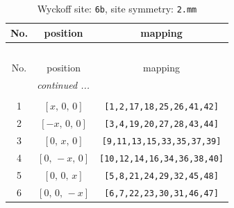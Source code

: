 \documentclass[fleqn,8pt]{jsarticle}
\begin{document}
\renewcommand{\arraystretch}{1.2}
\begin{longtable}{ccc}
\caption{Wyckoff site: {\tt 6b}, site symmetry: {\tt 2.mm}}
 \\
 \hline \hline
No. & position & mapping \\ \hline \endfirsthead

\multicolumn{2}{l}{\tablename\ \thetable{}} \\
 \hline \hline
No. & position & mapping \\ \hline \endhead

 \hline \hline
\multicolumn{2}{r}{\footnotesize\it continued ...} \\ \endfoot

 \hline \hline
\multicolumn{2}{r}{} \\ \endlastfoot

1 & $\left[ x,\, 0,\, 0 \right]$ & {\tt [1,2,17,18,25,26,41,42]} \\ \hline
2 & $\left[ - x,\, 0,\, 0 \right]$ & {\tt [3,4,19,20,27,28,43,44]} \\ \hline
3 & $\left[ 0,\, x,\, 0 \right]$ & {\tt [9,11,13,15,33,35,37,39]} \\ \hline
4 & $\left[ 0,\, - x,\, 0 \right]$ & {\tt [10,12,14,16,34,36,38,40]} \\ \hline
5 & $\left[ 0,\, 0,\, x \right]$ & {\tt [5,8,21,24,29,32,45,48]} \\ \hline
6 & $\left[ 0,\, 0,\, - x \right]$ & {\tt [6,7,22,23,30,31,46,47]} \\
\end{longtable}
\renewcommand{\arraystretch}{1.2}
\end{document}
